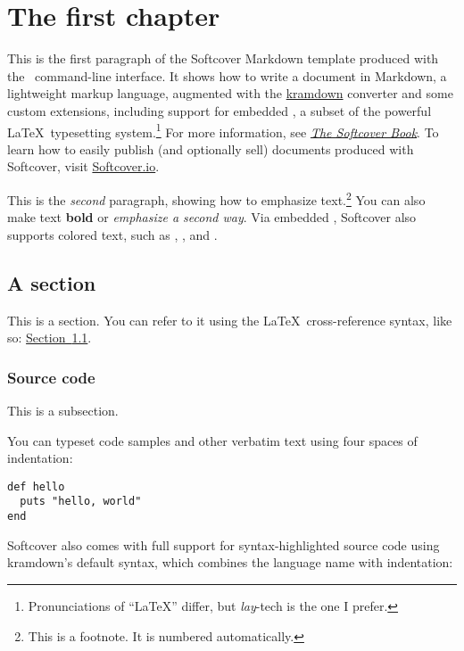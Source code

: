 \chapter{The first chapter}

\label{cha:a_chapter}

This is the first paragraph of the Softcover Markdown template produced with the \softcover\ command-line interface. It shows how to write a document in Markdown, a lightweight markup language, augmented with the \href{http://kramdown.gettalong.org/}{kramdown} converter and some custom extensions, including support for embedded \PolyTeX, a subset of the powerful \LaTeX\ typesetting system.\footnote{Pronunciations of ``LaTeX'' differ, but \emph{lay}-tech is the one I prefer.} For more information, see \href{http://manual.softcover.io/book}{\emph{The Softcover Book}}. To learn how to easily publish (and optionally sell) documents produced with Softcover, visit \href{http://softcover.io/}{Softcover.io}.

This is the \emph{second} paragraph, showing how to emphasize text.\footnote{This is a footnote. It is numbered automatically.} You can also make text \textbf{bold} or \emph{emphasize a second way}. Via embedded \PolyTeX, Softcover also supports colored text, such as , , and .

\section{A section}

\label{sec:a_section}

This is a section. You can refer to it using the \LaTeX\ cross-reference syntax, like so: \hyperref[sec:a_section]{Section~\ref{sec:a_section}}.

\subsection{Source code}

This is a subsection.

You can typeset code samples and other verbatim text using four spaces of indentation:

\begin{verbatim}
def hello
  puts "hello, world"
end
\end{verbatim}

Softcover also comes with full support for syntax-highlighted source code using kramdown's default syntax, which combines the language name with indentation:

